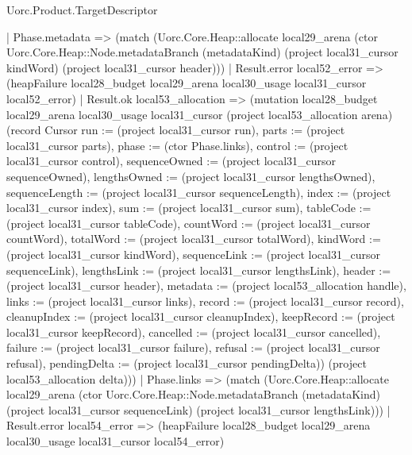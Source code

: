 \begin{lexlean}{Uorc.Product.TargetDescriptor}
\begin{semanticmodule}
{    | Phase.metadata => (match (Uorc.Core.Heap::allocate local29_arena (ctor Uorc.Core.Heap::Node.metadataBranch (metadataKind) (project local31_cursor kindWord) (project local31_cursor header)))
      | Result.error local52_error => (heapFailure local28_budget local29_arena local30_usage local31_cursor local52_error)
      | Result.ok local53_allocation => (mutation local28_budget local29_arena local30_usage local31_cursor (project local53_allocation arena) (record Cursor {run := (project local31_cursor run), parts := (project local31_cursor parts), phase := (ctor Phase.links), control := (project local31_cursor control), sequenceOwned := (project local31_cursor sequenceOwned), lengthsOwned := (project local31_cursor lengthsOwned), sequenceLength := (project local31_cursor sequenceLength), index := (project local31_cursor index), sum := (project local31_cursor sum), tableCode := (project local31_cursor tableCode), countWord := (project local31_cursor countWord), totalWord := (project local31_cursor totalWord), kindWord := (project local31_cursor kindWord), sequenceLink := (project local31_cursor sequenceLink), lengthsLink := (project local31_cursor lengthsLink), header := (project local31_cursor header), metadata := (project local53_allocation handle), links := (project local31_cursor links), record := (project local31_cursor record), cleanupIndex := (project local31_cursor cleanupIndex), keepRecord := (project local31_cursor keepRecord), cancelled := (project local31_cursor cancelled), failure := (project local31_cursor failure), refusal := (project local31_cursor refusal), pendingDelta := (project local31_cursor pendingDelta)}) (project local53_allocation delta)))
    | Phase.links => (match (Uorc.Core.Heap::allocate local29_arena (ctor Uorc.Core.Heap::Node.metadataBranch (metadataKind) (project local31_cursor sequenceLink) (project local31_cursor lengthsLink)))
      | Result.error local54_error => (heapFailure local28_budget local29_arena local30_usage local31_cursor local54_error)
}
\end{semanticmodule}
\end{lexlean}
